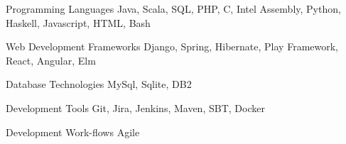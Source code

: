 

\begin{cvskills}

  \cvskill
    {Programming Languages} %
    {Java, Scala, SQL, PHP, C, Intel Assembly, Python, Haskell, Javascript, HTML, Bash} %

  \cvskill
    {Web Development Frameworks} %
    {Django, Spring, Hibernate, Play Framework, React, Angular, Elm  } %
 
  \cvskill
    {Database Technologies} %
    {MySql, Sqlite, DB2} %

 \cvskill
    {Development Tools} %
    {Git, Jira, Jenkins, Maven, SBT, Docker} %
    
 \cvskill
    {Development Work-flows} %
    {Agile} %


\end{cvskills}
